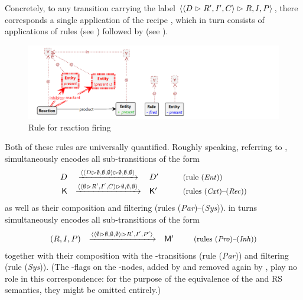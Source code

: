 Concretely, to any transition carrying the label $\langle \langle D\vartriangleright R',I',C\rangle\vartriangleright R,I,P\rangle$, there corresponds a single application of the recipe \fireR, which in turn consists of applications of rules \contextR (see ) followed by \reactR (see ).
%
%
\begin{figure}
\centering
\includegraphics[scale=.2]{figs/react}
\caption{Rule for reaction firing}
\label{fig:react}
\end{figure}
%
Both of these rules are universally quantified. Roughly speaking, referring to , \contextR simultaneously encodes all sub-transitions of the form
%
\[\begin{array}{rcll}
D & \xrightarrow{\obs{\obs{D}{\emptyset,\emptyset,\emptyset}}
                     {\emptyset,\emptyset,\emptyset}} & D'
  & \quad\text{\small{(rule (\textit{Ent}))}} \\
\mathsf K
  & \xrightarrow{\obs{\obs{\emptyset}{R',I',C}}
                     {\emptyset,\emptyset,\emptyset}} & \mathsf K'
  & \quad\text{\small{(rules (\textit{Cxt})--(\textit{Rec}))}}
\end{array}\]
%
as well as their composition and filtering (rules (\textit{Par})--(\textit{Sys})). \reactR in turns simultaneously encodes all sub-transitions of the form
%
\[\begin{array}{rcll}
(R,I,P)
  & \xrightarrow{\obs{\obs{\emptyset}
                     {\emptyset,\emptyset,\emptyset}}{R',I',P'}} & \mathsf M'
  & \enspace\text{\small{(rules (\textit{Pro})--(\textit{Inh}))}}
\end{array}\]
%
together with their composition with the \contextR-transitions (rule (\textit{Par})) and filtering (rule (\textit{Sys})). (The \fired-flags on the \Step-nodes, added by \contextR and removed again by \reactR, play no role in this correspondence: for the purpose of the equivalence of the \GROOVE and RS semantics, they might be omitted entirely.)

